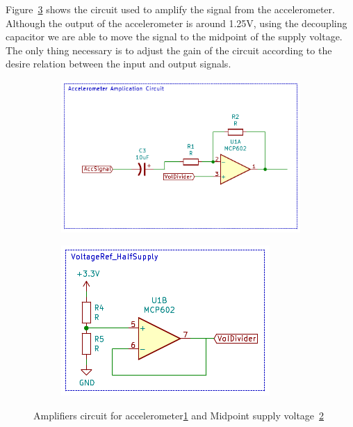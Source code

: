 Figure~\ref{fig:accCircCom} shows the circuit used to amplify the signal from the accelerometer. Although the output of the accelerometer is around 1.25V, using the decoupling capacitor we are able to move the signal to the midpoint of the supply voltage. The only thing necessary is to adjust the gain of the circuit according to the desire relation between the input and output signals.
\begin{figure}[]
    \centering
    \begin{subfigure}{0.3\textwidth}
        \centering
        \includegraphics[width=\linewidth]{Chapters/4CHP/Figures/AmpAccCirc.pdf}
        \caption{}{}
        \label{subfig:AccAmpCirc}
    \end{subfigure}
    \begin{subfigure}{0.3\textwidth}
        \centering
        \includegraphics[width=\linewidth]{Chapters/4CHP/Figures/HalfSupply.pdf}
        \caption{}{}
        \label{subfig:VoltageDiv}
    \end{subfigure}
    \caption{Amplifiers circuit for accelerometer\ref{subfig:AccAmpCirc} and Midpoint supply voltage~\ref{subfig:VoltageDiv}}{}
\label{fig:accCircCom}
\end{figure}

